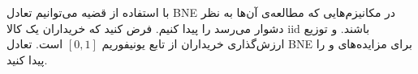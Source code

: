 با استفاده از قضیه
می‌توانیم تعادل BNE در مکانیزم‌هایی که مطالعه‌ی آن‌ها به نظر دشوار می‌رسد را پیدا کنیم. فرض کنید که خریداران یک کالا iid باشند. و توزیع ارزش‌گذاری خریداران از تابع یونیفوریم $[0, 1]$ است. تعادل BNE برای مزاید‌ه‌‌های
و
را پیدا کنید.
